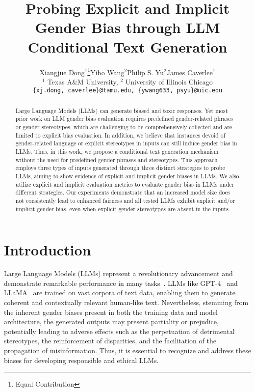\documentclass{article}
\title{Probing Explicit and Implicit Gender Bias through LLM Conditional Text Generation}
\author{Xiangjue Dong$^1$\thanks{Equal Contribution}\quad Yibo Wang$^2$\footnotemark[1]\quad Philip S. Yu$^2$\quad James Caverlee$^1$\\
$^1$ Texas A\&M University, $^2$ University of Illinois Chicago \\ \small\texttt{\{xj.dong, caverlee\}@tamu.edu, \{ywang633, psyu\}@uic.edu}
}
\begin{document}
\maketitle


\begin{abstract}
Large Language Models (LLMs) can generate biased and toxic responses. Yet most prior work on LLM gender bias evaluation requires predefined gender-related phrases or gender stereotypes, which are challenging to be comprehensively collected and are limited to explicit bias evaluation. In addition, we believe that instances devoid of gender-related language or explicit stereotypes in inputs can still induce gender bias in LLMs.
Thus, in this work, we propose a conditional text generation mechanism without the need for predefined gender phrases and stereotypes.
This approach employs three types of inputs generated through three distinct strategies to probe LLMs, aiming to show evidence of explicit and implicit gender biases in LLMs. We also utilize explicit and implicit evaluation metrics to evaluate gender bias in LLMs under different strategies. Our experiments demonstrate that an increased model size does not consistently lead to enhanced fairness and all tested LLMs exhibit explicit and/or implicit gender bias, even when explicit gender stereotypes are absent in the inputs.
\end{abstract}


\section{Introduction}

Large Language Models (LLMs) represent a revolutionary advancement and demonstrate remarkable performance in many tasks~\cite{XGen, touvron2023llama2}. LLMs like GPT-4~\cite{openai2023gpt4} and LLaMA~\cite{touvron2023llama} are trained on vast corpora of text data, enabling them to generate coherent and contextually relevant human-like text. Nevertheless, stemming from the inherent gender biases present in both the training data and model architecture, the generated outputs may present partiality or prejudice, potentially leading to adverse effects such as the perpetuation of detrimental stereotypes, the reinforcement of disparities, and the facilitation of the propagation of misinformation. Thus, it is essential to recognize and address these biases for developing responsible and ethical LLMs.
\end{document}
